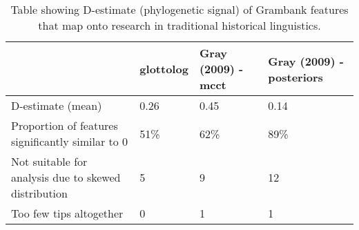 \begin{table}[ht]
\centering
\begin{tabular}{p{6cm}p{2.2cm}p{2.2cm}p{2.2cm}}
  \hline
  & glottolog & Gray (2009) - mcct & Gray (2009) - posteriors \\ 
  \hline
D-estimate (mean) & 0.26 & 0.45 & 0.14 \\ 
  Proportion of features significantly similar to 0 & 51\% & 62\% & 89\% \\ 
  Not suitable for analysis due to skewed distribution & 5 & 9 & 12 \\ 
  Too few tips altogether & 0 & 1 & 1 \\ 
   \hline
\end{tabular}
\caption{Table showing D-estimate (phylogenetic signal) of Grambank features that map onto research in traditional historical linguistics.} 
\label{d_estimate_summary}
\end{table}
